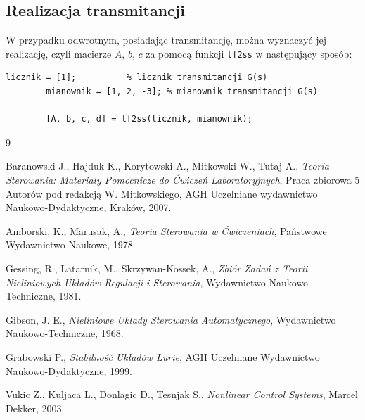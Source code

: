 \documentclass{article}
\begin{document}
    \subsection{Realizacja transmitancji}
    W przypadku odwrotnym, posiadając transmitancję, można wyznaczyć jej realizację, czyli macierze $A$, $b$, $c$ za pomocą funkcji \texttt{tf2ss} w następujący sposób:
    \begin{lstlisting}[style=Matlab-editor]
        licznik = [1];          % licznik transmitancji G(s)
        mianownik = [1, 2, -3]; % mianownik transmitancji G(s)
        
        [A, b, c, d] = tf2ss(licznik, mianownik);
    \end{lstlisting}

\newpage
\begin{thebibliography}{9}

  Baranowski J., Hajduk K., Korytowski A., Mitkowski W., Tutaj A.,
  \emph{Teoria Sterowania: Materiały Pomocnicze do Ćwiczeń Laboratoryjnych},
  Praca zbiorowa 5 Autorów pod redakcją W. Mitkowskiego,
  AGH Uczelniane wydawnictwo Naukowo-Dydaktyczne,
  Kraków, 2007.

  Amborski, K., Marusak, A.,
  \emph{Teoria Sterowania w Ćwiczeniach},
  Państwowe Wydawnictwo Naukowe,
  1978.

  Gessing, R., Latarnik, M., Skrzywan-Kossek, A.,
  \emph{Zbiór Zadań z Teorii Nieliniowych Układów Regulacji i Sterowania},
  Wydawnictwo Naukowo-Techniczne,
  1981.

  Gibson, J. E.,
  \emph{Nieliniowe Układy Sterowania Automatycznego},
  Wydawnictwo Naukowo-Techniczne,
  1968.

  Grabowski P.,
  \emph{Stabilność Układów Lurie},
  AGH Uczelniane Wydawnictwo Naukowo-Dydaktyczne,
  1999.


  Vukic Z., Kuljaca L., Donlagic D., Tesnjak S.,
  \emph{Nonlinear Control Systems},
  Marcel Dekker,
  2003.

\end{thebibliography}
\end{document}
